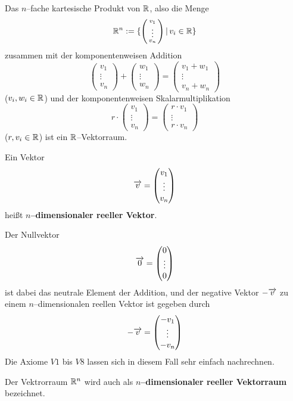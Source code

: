 \begin{beispiel}\label{LA_vr_rn} 
Das $n$--fache kartesische Produkt von $\mathbb R$, also die Menge
  	$$ \mathbb R^n := \{ \left( \begin{smallmatrix} v_1 \\ \vdots \\ v_n 
     	\end{smallmatrix} \right) \vert \, v_i \in \mathbb R \} $$
zusammen mit der komponentenweisen Addition 
  	$$ \left( \begin{smallmatrix} v_1 \\ \vdots \\ v_n 
     	\end{smallmatrix} \right) + \left( \begin{smallmatrix} w_1 \\ \vdots \\ w_n 
     	\end{smallmatrix} \right) = \left( \begin{smallmatrix} v_1 + w_1 \\ \vdots \\ 
     	v_n + w_n  \end{smallmatrix} \right) $$ 
($v_i, w_i \in \mathbb R$) und der komponentenweisen Skalarmultiplikation
  	$$ r \cdot \left( \begin{smallmatrix} v_1 \\ \vdots \\ v_n 
     	\end{smallmatrix} \right) = \left( \begin{smallmatrix} r \cdot v_1 \\ \vdots \\ 
     	r \cdot v_n \end{smallmatrix} \right) $$
($r, v_i \in \mathbb R$) ist ein $\mathbb R$--Vektorraum. 

Ein Vektor 
	$$ \overrightarrow{v} = \begin{pmatrix} v_1 \\ \vdots \\ v_n \end{pmatrix} $$
heißt \textbf{$n$--dimensionaler reeller Vektor}. 

Der Nullvektor 
	$$ \overrightarrow{0} = \begin{pmatrix} 0 \\ \vdots \\ 0 \end{pmatrix} $$
ist dabei das neutrale Element der Addition, und der negative Vektor $- \overrightarrow{v}$ zu 
einem $n$--dimensionalen reellen Vektor ist gegeben durch 
	$$ - \overrightarrow{v} = \begin{pmatrix} -v_1 \\ \vdots \\ - v_n \end{pmatrix} $$
Die Axiome $V1$ bis $V8$ lassen sich in diesem Fall sehr einfach nachrechnen. 

Der Vektrorraum $\mathbb R^n$ wird auch als 
\textbf{$n$--dimensionaler reeller Vektorraum} bezeichnet.
\end{beispiel} 

